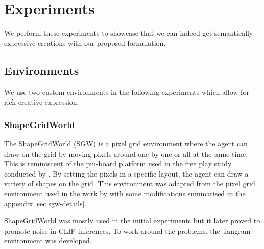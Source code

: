 \chapter{Experiments}
\label{sec:experiments}

We perform these experiments to showcase that we can indeed get semantically expressive creations with our proposed formulation.


\section{Environments}

We use two custom environments in the following experiments which allow for rich creative expression.

\subsection{ShapeGridWorld}
\label{sec:sgw}
The ShapeGridWorld (SGW) is a pixel grid environment where the agent can draw on the grid by moving pixels around one-by-one or all at the same time.
This is reminiscent of the pin-board platform used in the free play study conducted by \citet{diggs}.
By setting the pixels in a specific layout, the agent can draw a variety of shapes on the grid.
This environment was adapted from the pixel grid environment used in the work by \citet{rair} with some modifications summarised in the appendix \ref{sec:sgw-details}.


ShapeGridWorld was mostly used in the initial experiments but it later proved to promote noise in CLIP inferences.
To work around the problems, the Tangram environment was developed.

